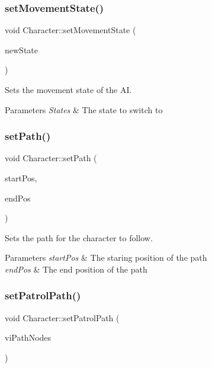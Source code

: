 \subsubsection{\texorpdfstring{set\+Movement\+State()}{setMovementState()}}
{\footnotesize\ttfamily void Character\+::set\+Movement\+State (\begin{DoxyParamCaption}\item[{\hyperlink{_character_8h_a808e5cd4979462d3bbe3070d7d147444}{States}}]{new\+State }\end{DoxyParamCaption})}



Sets the movement state of the AI. 


\begin{DoxyParams}{Parameters}
{\em States} & The state to switch to \\
\hline
\end{DoxyParams}
\mbox{\label{class_character_a4135c75013813ae37fc4212a3000cabb}} 
\subsubsection{\texorpdfstring{set\+Path()}{setPath()}}
{\footnotesize\ttfamily void Character\+::set\+Path (\begin{DoxyParamCaption}\item[{sf\+::\+Vector2f}]{start\+Pos,  }\item[{sf\+::\+Vector2f}]{end\+Pos }\end{DoxyParamCaption})}



Sets the path for the character to follow. 


\begin{DoxyParams}{Parameters}
{\em start\+Pos} & The staring position of the path \\
\hline
{\em end\+Pos} & The end position of the path \\
\hline
\end{DoxyParams}
\mbox{\label{class_character_a35bdf7823ddd768ac34ae91e3681165f}} 
\subsubsection{\texorpdfstring{set\+Patrol\+Path()}{setPatrolPath()}}
{\footnotesize\ttfamily void Character\+::set\+Patrol\+Path (\begin{DoxyParamCaption}\item[{std\+::vector$<$ int $>$}]{vi\+Path\+Nodes }\end{DoxyParamCaption})}



